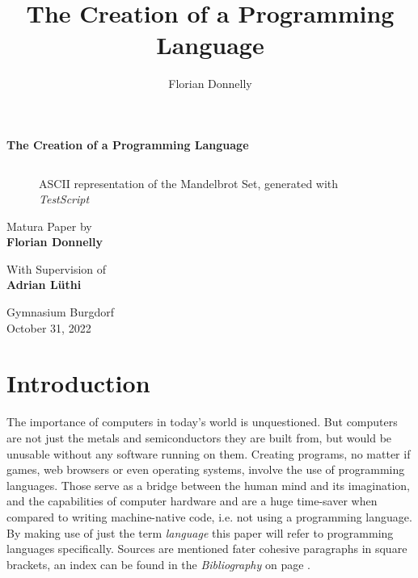 \documentclass[12pt,a4paper]{article}
\author{Florian Donnelly}
\title{The Creation of a Programming Language}
\newcommand{\paste}[1]{
    \begin{tabular}{c}
    
    \end{tabular}
}
\newcommand{\name}{\emph{TestScript}}
\begin{document}
\begin{titlepage}\begin{center}

    \vspace*{1.5cm}
    \Huge
    \textbf{The Creation of a Programming Language}

    \vspace{1.5cm}

    \begin{figure}[H]
        \centering
        \paste{paper/mandelbrot.tex}
        \caption{ASCII representation of the Mandelbrot Set, generated with \name{}}
        \label{f_mandelbrot}
    \end{figure}


    \Large
    \vspace{1.5cm}
    Matura Paper by\\ \textbf{Florian Donnelly}
    
    \vspace{0.5cm}
    With Supervision of\\ \textbf{Adrian Lüthi}

    \vfill
    Gymnasium Burgdorf\\ October 31, 2022

\end{center}\end{titlepage}

\normalsize


\tableofcontents\newpage

\section{Introduction}
The importance of computers in today's world is unquestioned.
But computers are not just the metals and semiconductors they are built from,
but would be unusable without any software running on them.
Creating programs, no matter if games, web browsers or even operating systems,
involve the use of programming languages.
Those serve as a bridge between the human mind and its imagination, and
the capabilities of computer hardware and are a huge time-saver when compared
to writing machine-native code, i.e. not using a programming language.
By making use of just the term \emph{language} this paper will refer to programming
languages specifically. Sources are mentioned fater cohesive paragraphs in
square brackets, an index can be found in the \emph{Bibliography} on page
\pageref{bibliography}.
\end{document}

